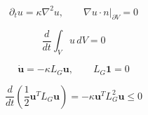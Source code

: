\[
\partial_t u=\kappa\nabla^2u,
\qquad
\nabla u\cdot n|_{\partial V}=0
\]

\[
\frac{d}{dt}\int_Vu\,dV=0
\]

\[
\dot{\mathbf u}=-\kappa L_G\mathbf u,
\qquad
L_G\mathbf 1=0
\]

\[
\frac{d}{dt}\left(\frac12\mathbf u^TL_G\mathbf u\right)
=-\kappa\mathbf u^TL_G^2\mathbf u\leq0
\]
